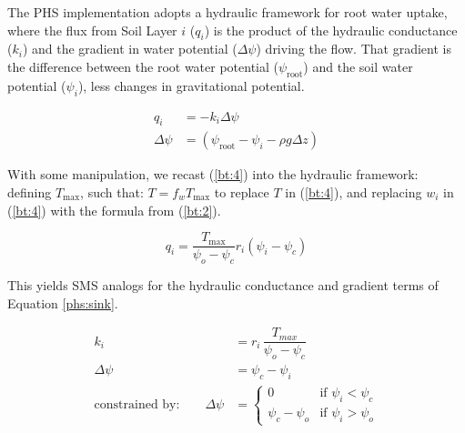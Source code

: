 \documentclass[draft,linenumbers]{agujournal}
\begin{document}
    The PHS implementation adopts a hydraulic framework for root water uptake, where the flux from Soil Layer $i$ ($q_i$) is 
    the product of the hydraulic conductance ($k_i$) and the gradient in water potential ($\Delta\psi$) driving the flow.
    That gradient is the difference between the root water potential ($\psi_{\text{root}}$) and the soil water potential ($\psi_i$), less changes in gravitational potential.
    \begin{linenomath*}
    \begin{equation}
        \begin{aligned}
    q_i &= -k_i \Delta\psi \\
    \Delta\psi &= \left(\psi_{\text{root}}-\psi_{i}-\rho g \Delta z\right)
    \label{phs:sink}
    \end{aligned}
    \end{equation}
    \end{linenomath*}
    
    With some manipulation, we recast (\ref{bt:4}) into the hydraulic framework: defining $T_{\text{max}}$, such that: $T = 
    f_w T_{\text{max}}$ to replace $T$ in (\ref{bt:4}), and replacing $w_i$ in (\ref{bt:4}) with the formula from (\ref{bt:2}).
    
    \begin{linenomath*}
    \begin{equation} 
    q_i = \dfrac{T_{\text{max}}}{\psi_{o}-\psi_{c}} r_i \left(\psi_i-\psi_{c} \right)
    \end{equation}
    \end{linenomath*}
    
    This yields SMS analogs for the hydraulic conductance and gradient terms of Equation \ref{phs:sink}.
    \begin{linenomath*}
    \begin{equation} \begin{aligned}
    k_i &= r_i \, \dfrac{T_{max}}{\psi_{o}-\psi_{c}} \\
    \Delta\psi &=  \psi_{c}-\psi_i \\
    \mbox{constrained by:} \qquad
    \Delta\psi &=
    \begin{cases}
    0                          & \text{if } \psi_i<\psi_{c}  \\
    \psi_{c}-\psi_{o} & \text{if } \psi_i>\psi_{o}
    \label{kb}
    \end{cases}
    \end{aligned}\end{equation}
    \end{linenomath*}
\end{document}
